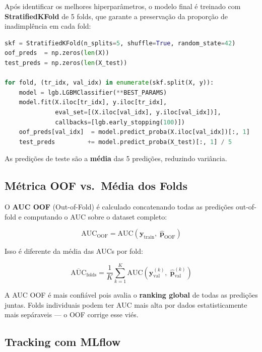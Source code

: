 \documentclass[12pt, a4paper]{article}
\begin{document}
Ap\'os identificar os melhores hiperpar\^ametros, o modelo final \'e treinado com
\textbf{StratifiedKFold} de 5 folds, que garante a preserva\c{c}\~ao da propor\c{c}\~ao
de inadimpl\^encia em cada fold:

\begin{lstlisting}[language=Python, caption={Treinamento com valida\c{c}\~ao cruzada estratificada}]
skf = StratifiedKFold(n_splits=5, shuffle=True, random_state=42)
oof_preds  = np.zeros(len(X))
test_preds = np.zeros(len(X_test))

for fold, (tr_idx, val_idx) in enumerate(skf.split(X, y)):
    model = lgb.LGBMClassifier(**BEST_PARAMS)
    model.fit(X.iloc[tr_idx], y.iloc[tr_idx],
              eval_set=[(X.iloc[val_idx], y.iloc[val_idx])],
              callbacks=[lgb.early_stopping(100)])
    oof_preds[val_idx]  = model.predict_proba(X.iloc[val_idx])[:, 1]
    test_preds         += model.predict_proba(X_test)[:, 1] / 5
\end{lstlisting}

As predi\c{c}\~oes de teste s\~ao a \textbf{m\'edia} das 5 predi\c{c}\~oes, reduzindo
vari\^ancia.

\subsection{M\'etrica OOF vs.\ M\'edia dos Folds}

O \textbf{AUC OOF} (Out-of-Fold) \'e calculado concatenando todas as predi\c{c}\~oes
out-of-fold e computando o AUC sobre o dataset completo:

\begin{equation}
    \text{AUC}_{\text{OOF}} = \text{AUC}\!\left(\mathbf{y}_{\text{train}},\;
    \hat{\mathbf{p}}_{\text{OOF}}\right)
\end{equation}

Isso \'e diferente da m\'edia das AUCs por fold:

\begin{equation}
    \overline{\text{AUC}}_{\text{folds}} = \frac{1}{K}
    \sum_{k=1}^{K} \text{AUC}\!\left(\mathbf{y}^{(k)}_{\text{val}},\;
    \hat{\mathbf{p}}^{(k)}_{\text{val}}\right)
\end{equation}

A AUC OOF \'e mais confi\'avel pois avalia o \textbf{ranking global} de todas as
predi\c{c}\~oes juntas. Folds individuais podem ter AUC mais alta por dados
estatisticamente mais sep\'araveis --- o OOF corrige esse vi\'es.

\subsection{Tracking com MLflow}
\end{document}
